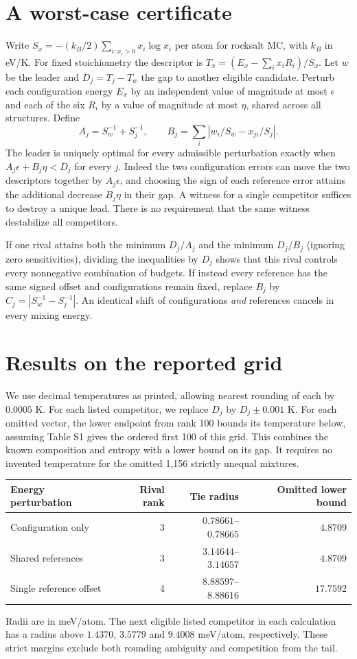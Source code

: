 \documentclass[11pt]{article}
\begin{document}
\section{A worst-case certificate}
Write $S_x=-(k_B/2)\sum_{i:x_i>0}x_i\log x_i$ per atom for rocksalt MC, with $k_B$ in eV/K. For fixed stoichiometry the descriptor is
$T_x=(E_x-\sum_i x_i R_i)/S_x$. Let $w$ be the leader and $D_j=T_j-T_w$ the gap to another eligible candidate. Perturb each configuration energy $E_x$ by an independent value of magnitude at most $\epsilon$ and each of the six $R_i$ by a value of magnitude at most $\eta$, shared across all structures. Define
\[
 A_j=S_w^{-1}+S_j^{-1},\qquad
 B_j=\sum_i |w_i/S_w-x_{ji}/S_j|.
\]
The leader is uniquely optimal for every admissible perturbation exactly when
$A_j\epsilon+B_j\eta<D_j$ for every $j$. Indeed the two configuration errors can move the two descriptors together by $A_j\epsilon$, and choosing the sign of each reference error attains the additional decrease $B_j\eta$ in their gap. A witness for a single competitor suffices to destroy a unique lead. There is no requirement that the same witness destabilize all competitors.

If one rival attains both the minimum $D_j/A_j$ and the minimum $D_j/B_j$ (ignoring zero sensitivities), dividing the inequalities by $D_j$ shows that this rival controls every nonnegative combination of budgets. If instead every reference has the same signed offset and configurations remain fixed, replace $B_j$ by $C_j=|S_w^{-1}-S_j^{-1}|$. An identical shift of configurations \emph{and} references cancels in every mixing energy.

\section{Results on the reported grid}
We use decimal temperatures as printed, allowing nearest rounding of each by $0.0005$ K. For each listed competitor, we replace $D_j$ by $D_j\pm0.001$ K. For each omitted vector, the lower endpoint from rank 100 bounds its temperature below, assuming Table S1 gives the ordered first 100 of this grid. This combines the known composition and entropy with a lower bound on its gap. It requires no invented temperature for the omitted 1,156 strictly unequal mixtures.

\begin{center}
\begin{tabular}{lrrr}
\toprule
Energy perturbation & Rival rank & Tie radius & Omitted lower bound\\
\midrule
Configuration only & 3 & $0.78661$--$0.78665$ & $4.8709$\\
Shared references & 3 & $3.14644$--$3.14657$ & $4.8709$\\
Single reference offset & 4 & $8.88597$--$8.88616$ & $17.7592$\\
\bottomrule
\end{tabular}
\end{center}
Radii are in meV/atom. The next eligible listed competitor in each calculation has a radius above $1.4370$, $3.5779$ and $9.4008$ meV/atom, respectively. These strict margins exclude both rounding ambiguity and competition from the tail.
\end{document}
